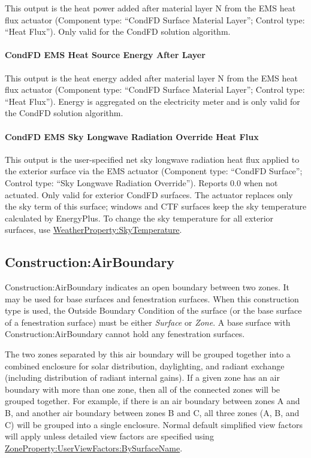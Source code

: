 This output is the heat power added after material layer N from the EMS heat flux actuator (Component type: ``CondFD Surface Material Layer''; Control type: ``Heat Flux''). Only valid for the CondFD solution algorithm.

\paragraph{CondFD EMS Heat Source Energy After Layer}

This output is the heat energy added after material layer N from the EMS heat flux actuator (Component type: ``CondFD Surface Material Layer''; Control type: ``Heat Flux''). Energy is aggregated on the electricity meter and is only valid for the CondFD solution algorithm.

\paragraph{CondFD EMS Sky Longwave Radiation Override Heat Flux}

This output is the user-specified net sky longwave radiation heat flux applied to the exterior surface via the EMS actuator (Component type: ``CondFD Surface''; Control type: ``Sky Longwave Radiation Override''). Reports 0.0 when not actuated. Only valid for exterior CondFD surfaces. The actuator replaces only the sky term of this surface; windows and CTF surfaces keep the sky temperature calculated by EnergyPlus. To change the sky temperature for all exterior surfaces, use \hyperref[weatherpropertyskytemperature]{WeatherProperty:SkyTemperature}.

\subsection{Construction:AirBoundary}\label{constructionairboundary}

Construction:AirBoundary indicates an open boundary between two zones. It may be used for base surfaces and fenestration surfaces.
When this construction type is used, the Outside Boundary Condition of the surface (or the base surface of a fenestration surface)
must be either \textit{Surface} or \textit{Zone}. A base surface with Construction:AirBoundary cannot hold any fenestration surfaces.

The two zones separated by this air boundary will be grouped together into a combined enclosure for solar distribution, daylighting, and radiant exchange (including distribution of radiant internal gains). If a given zone has an air boundary with more than one zone, then all of the connected zones will be grouped together. For example, if there is an air boundary between zones A and B, and another air boundary between zones B and C, all three zones (A, B, and C) will be grouped into a single enclosure. Normal default simplified view factors will apply unless detailed view factors are specified using \hyperref[zonepropertyuserviewfactorsbysurfacename]{ZoneProperty:UserViewFactors:BySurfaceName}.

